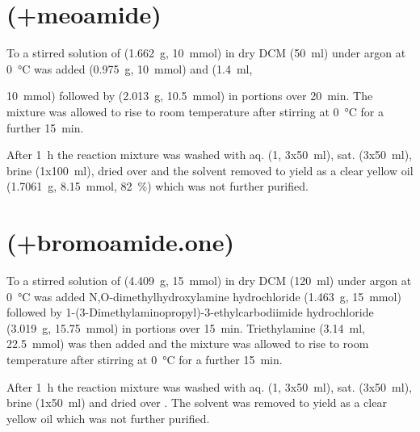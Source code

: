 
\section{ (\cmpd+{meoamide})}
To a stirred solution of  (\SI{1.662}{\gram}, \SI{10}{\milli\mol}) in dry DCM (\SI{50}{\milli\litre}) under argon at \SI{0}{\celsius} was added  (\SI{0.975}{\gram}, \SI{10}{\milli\mol}) and  (\SI{1.4}{\milli\litre}, {\SI{10}{\milli\mol}) followed by  (\SI{2.013}{\gram}, \SI{10.5}{\milli\mol}) in portions over \SI{20}{\minute}. The mixture was allowed to rise to room temperature after stirring at \SI{0}{\celsius} for a further \SI{15}{\minute}.

After \SI{1}{\hour} the reaction mixture was washed with aq.  (\SI{1}{\Molar}, 3x\SI{50}{\milli\litre}), sat.  (3x\SI{50}{\milli\litre}), brine (1x\SI{100}{\milli\litre}), dried over  and the solvent removed \invacuo to yield  as a clear yellow oil (\SI{1.7061}{\gram}, \SI{8.15}{\milli\mole}, \SI{82}{\percent}) which was not further purified.


\section{ (\cmpd+{bromoamide.one})}
To a stirred solution of  (\SI{4.409}{\gram}, \SI{15}{\milli\mol}) in dry DCM (\SI{120}{\milli\litre}) under argon at \SI{0}{\celsius} was added N,O-dimethylhydroxylamine hydrochloride (\SI{1.463}{\gram}, \SI{15}{\milli\mol}) followed by 1-(3-Dimethylaminopropyl)-3-ethylcarbodiimide hydrochloride (\SI{3.019}{\gram}, \SI{15.75}{\milli\mol}) in portions over \SI{15}{\minute}. Triethylamine (\SI{3.14}{\milli\litre}, \SI{22.5}{\milli\mol}) was then added and the mixture was allowed to rise to room temperature after stirring at \SI{0}{\celsius} for a further \SI{15}{\minute}.

After \SI{1}{\hour} the reaction mixture was washed with aq.  (\SI{1}{\Molar}, 3x\SI{50}{\milli\litre}), sat.  (3x\SI{50}{\milli\litre}), brine (1x\SI{50}{\milli\litre}) and dried over . The solvent was removed \invacuo to yield  as a clear yellow oil which was not further purified.

}
